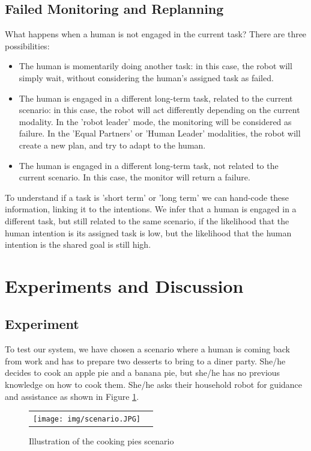\subsection{Failed Monitoring and Replanning}
What happens when a human is not engaged in the current task? There are three possibilities:
\begin{itemize}
\item The human is momentarily doing another task: in this case, the robot will simply wait, without considering the human's assigned task as failed.
\item The human is engaged in a different long-term task, related to the current scenario: in this case, the robot will act differently depending on the current modality. In the 'robot leader' mode, the monitoring will be considered as failure. In the 'Equal Partners' or 'Human Leader' modalities, the robot will create a new plan, and try to adapt to the human.  
\item The human is engaged in a different long-term task, not related to the current scenario. In this case, the monitor will return a failure.
\end{itemize}

To understand if a task is 'short term' or 'long term' we can hand-code these information, linking it to the intentions. We infer that a human is engaged in a different task, but still related to the same scenario, if the likelihood that the human intention is its assigned task is low, but the likelihood that the human intention is the shared goal is still high. 



\section{Experiments and Discussion}
\label{plan_management-experiments}


 \subsection{Experiment}
 \label{sec:experiment}
To test our system, we have chosen a scenario where a human is coming back from work and has to prepare two desserts to bring to a diner party. She/he decides to cook an apple pie and a banana pie, but she/he has no previous knowledge on how to cook them. She/he asks their household robot for guidance and assistance as shown in Figure \ref{fig:scenario}. 

\begin{figure}[ht!]

  \vspace{-6pt}
 \centering
 \begin{tabular}{cc}
  \texttt{[image: img/scenario.JPG]}
 \end{tabular}
   \vspace{-6pt}
 \caption{Illustration of the cooking pies scenario}
 \label{fig:scenario}
   \vspace{-10pt}
 \end{figure}

